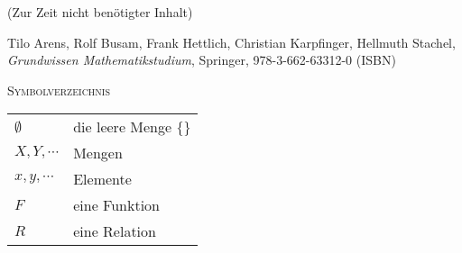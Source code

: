 \documentclass[a4paper]{amsart}
\theoremstyle{definition}
\begin{document}
\begin{backup}
    (Zur Zeit nicht benötigter Inhalt)
\end{backup}

\begin{thebibliography}{9}

      Tilo Arens, Rolf Busam, Frank Hettlich, Christian Karpfinger, Hellmuth Stachel, \emph{Grundwissen Mathematikstudium},
      Springer, 978-3-662-63312-0 (ISBN)
      
\end{thebibliography}

\begin{large}
    \centerline{\textsc{Symbolverzeichnis}}
\end{large}
\bigskip

\renewcommand*{\arraystretch}{1}

\begin{tabular}{ll}
    $\emptyset$             & die leere Menge $\{\}$\\
    $X, Y, \cdots$          & Mengen\\
    $x, y, \cdots$             & Elemente\\
    $F$                 & eine Funktion\\
    $R$             & eine Relation
   
\end{tabular}
\end{document}
